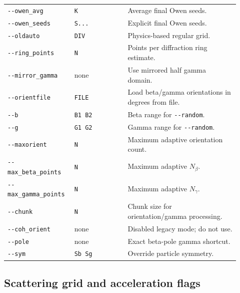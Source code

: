 \documentclass[
  10pt,
  a4paper,
]{article}
\begin{document}
\begin{longtable}[]{@{}L{0.24\linewidth}L{0.22\linewidth}L{0.46\linewidth}@{}}
\texttt{-\/-owen\_avg} & \texttt{K} & Average final Owen seeds. \\
\texttt{-\/-owen\_seeds} & \texttt{S...} & Explicit final Owen seeds. \\
\texttt{-\/-oldauto} & \texttt{DIV} & Physics-based regular grid. \\
\texttt{-\/-ring\_points} & \texttt{N} & Points per diffraction ring
estimate. \\
\texttt{-\/-mirror\_gamma} & none & Use mirrored half gamma domain. \\
\texttt{-\/-orientfile} & \texttt{FILE} & Load beta/gamma orientations
in degrees from file. \\
\texttt{-\/-b} & \texttt{B1\ B2} & Beta range for
\texttt{-\/-random}. \\
\texttt{-\/-g} & \texttt{G1\ G2} & Gamma range for
\texttt{-\/-random}. \\
\texttt{-\/-maxorient} & \texttt{N} & Maximum adaptive orientation
count. \\
\texttt{-\/-max\_beta\_points} & \texttt{N} & Maximum adaptive
\(N_\beta\). \\
\texttt{-\/-max\_gamma\_points} & \texttt{N} & Maximum adaptive
\(N_\gamma\). \\
\texttt{-\/-chunk} & \texttt{N} & Chunk size for orientation/gamma
processing. \\
\texttt{-\/-coh\_orient} & none & Disabled legacy mode; do not use. \\
\texttt{-\/-pole} & none & Exact beta-pole gamma shortcut. \\
\texttt{-\/-sym} & \texttt{Sb\ Sg} & Override particle symmetry. \\
\end{longtable}

\subsection{Scattering grid and acceleration
flags}\label{scattering-grid-and-acceleration-flags}
\end{document}
